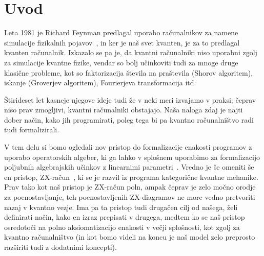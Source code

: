 \section{Uvod}

Leta 1981 je Richard Feynman predlagal uporabo računalnikov za namene simulacije fizikalnih pojavov~\cite{feynman-1981},
in ker je naš svet kvanten, je za to predlagal kvanten računalnik.
Izkazalo se pa je, da kvantni računalniki niso uporabni zgolj za simulacije kvantne fizike,
vendar so bolj učinkoviti tudi za mnoge druge klasične probleme, kot so faktorizacija števila na praštevila (Shorov algoritem), iskanje (Groverjev algoritem), Fourierjeva transformacija itd.

Štirideset let kasneje njegove ideje tudi že v neki meri izvajamo v praksi;
čeprav niso prav zmogljivi, kvantni računalniki obstajajo.
Naša naloga zdaj je najti dober način, kako jih programirati,
poleg tega bi pa kvantno računalništvo radi tudi formalizirali.

V tem delu si bomo ogledali nov pristop do formalizacije enakosti programov z uporabo operatorskih algeber, ki ga lahko v splošnem uporabimo za formalizacijo poljubnih algebrajskih učinkov z linearnimi parametri~\cite{algeff-lin-qpl}.
Vredno je še omeniti še en pristop, ZX-račun~\cite{zx-calculus,tdj}, ki se je razvil iz programa kategorične kvantne mehanike.
Prav tako kot naš pristop je ZX-račun poln, ampak čeprav je zelo močno orodje za poenostavljanje, teh poenostavljenih ZX-diagramov ne more vedno pretvoriti nazaj v kvantno vezje.
Ima pa ta pristop tudi drugačen cilj od našega, želi definirati način, kako en izraz prepisati v drugega,
medtem ko se naš pristop osredotoči na polno aksiomatizacijo enakosti v večji splošnosti, kot zgolj za kvantno računalništvo (in kot bomo videli na koncu je naš model zelo preprosto razširiti tudi z dodatnimi koncepti).
